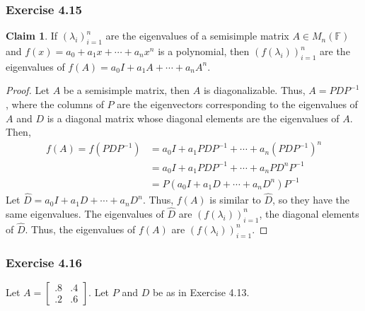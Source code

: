 \documentclass[letterpaper,12pt]{article}
\theoremstyle{definition}
\newtheorem{claim}[theorem]{Claim}
\begin{document}
\subsubsection*{Exercise 4.15}
\begin{claim}
	If $(\lambda_i)_{i=1}^n$ are the eigenvalues of a semisimple matrix $A \in M_n(\mathbb{F})$ and $f(x) = a_0 + a_1 x + \cdots  + a_n x^n$ is a polynomial, then $(f(\lambda_i))_{i=1}^{n}$ are the eigenvalues of $f(A) = a_0 I + a_1 A + \cdots + a_n A^n$. 
\end{claim}
\begin{proof}
	Let $A$ be a semisimple matrix, then $A$ is diagonalizable. Thus, $A = P D P^{-1}$, where the columns of $P$ are the eigenvectors corresponding to the eigenvalues of $A$ and $D$ is a diagonal matrix whose diagonal elements are the eigenvalues of $A$. Then,
	\begin{align*}
	f(A) = f( P D P^{-1}) &= a_0 I + a_1 P D P^{-1} + \cdots + a_n (P D P^{-1})^n \\
	&= a_0 I + a_1 P D P^{-1} + \cdots + a_n P D^n P^{-1} \\
	&= P( a_0 I + a_1 D + \cdots + a_n D^n) P^{-1} 
	\end{align*}
	Let $\hat{D} = a_0 I + a_1 D + \cdots + a_n D^n$. Thus, $f(A)$ is similar to $\hat{D}$, so they have the same eigenvalues. The eigenvalues of $\hat{D}$ are $(f(\lambda_i))_{i=1}^{n}$, the diagonal elements of $\hat{D}$. Thus, the eigenvalues of $f(A)$ are $(f(\lambda_i))_{i=1}^{n}$.
\end{proof}

\subsubsection*{Exercise 4.16}
Let $A = \begin{bmatrix} .8 & .4 \\ .2 & .6 \end{bmatrix}$. Let $P$ and $D$ be as in Exercise 4.13. 
\end{document}
